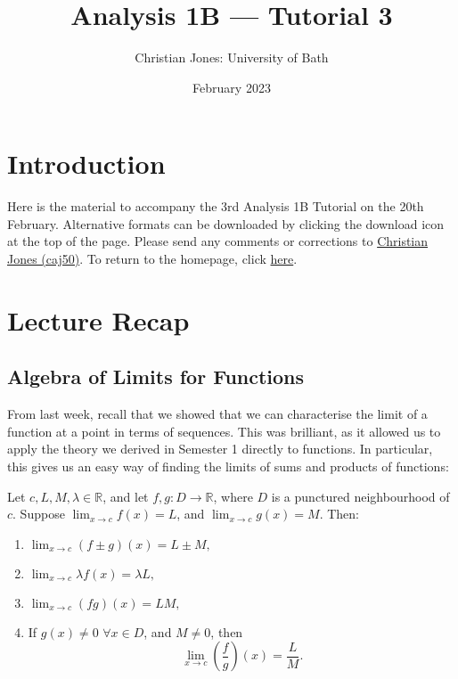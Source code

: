 \documentclass[
  17pt,
  a4paper]{extarticle}
\title{Analysis 1B --- Tutorial 3}
\author{Christian Jones: University of Bath}
\date{February 2023}
\theoremstyle{plain}
\theoremstyle{definition}
\theoremstyle{plain}
\theoremstyle{plain}
\theoremstyle{plain}
\theoremstyle{plain}
\theoremstyle{definition}
\theoremstyle{definition}
\theoremstyle{remark}
\theoremstyle{remark}
\let\BeginKnitrBlock\begin \let\EndKnitrBlock\end
\renewcommand{\;}{\,}
\begin{document}
\maketitle

{
\setcounter{tocdepth}{2}
\tableofcontents
}
\newpage
{}

\hypertarget{introduction}{%
\section*{Introduction}\label{introduction}}

Here is the material to accompany the 3rd Analysis 1B Tutorial on the 20th February. Alternative formats can be downloaded by clicking the download icon at the top of the page. Please send any comments or corrections to \href{mailto:caj50@bath.ac.uk}{Christian Jones (caj50)}. To return to the homepage, click \href{http://caj50.github.io/tutoring.html}{here}.

\hypertarget{lecture-recap}{%
\section{Lecture Recap}\label{lecture-recap}}

\hypertarget{algebra-of-limits-for-functions}{%
\subsection{Algebra of Limits for Functions}\label{algebra-of-limits-for-functions}}

From last week, recall that we showed that we can characterise the limit of a function at a point in terms of sequences. This was brilliant, as it allowed us to apply the theory we derived in Semester 1 directly to functions. In particular, this gives us an easy way of finding the limits of sums and products of functions:

\BeginKnitrBlock{theorem}[Algebra of Limits]
{\label{thm:thm1} }Let \(c, L, M, \lambda \in \mathbb{R}\), and let \(f,g: D \to \mathbb{R}\), where \(D\) is a punctured neighbourhood of \(c\). Suppose \(\lim_{x \to c}f(x) = L\), and \(\lim_{x \to c}g(x) = M\). Then:

\begin{enumerate}
\def\labelenumi{\arabic{enumi}.}
\item
  \(\lim_{x\to c}\left(f \pm g\right)(x) = L \pm M,\)
\item
  \(\lim_{x \to c}\lambda f(x) = \lambda L,\)
\item
  \(\lim_{x \to c}(fg)(x) = LM,\)
\item
  If \(g(x) \neq 0 \;\;\forall x \in D\), and \(M \neq 0\), then \[\lim_{x \to c}\left(\frac{f}{g}\right)(x) = \frac{L}{M}.\]
\end{enumerate}
\EndKnitrBlock{theorem}
\end{document}
